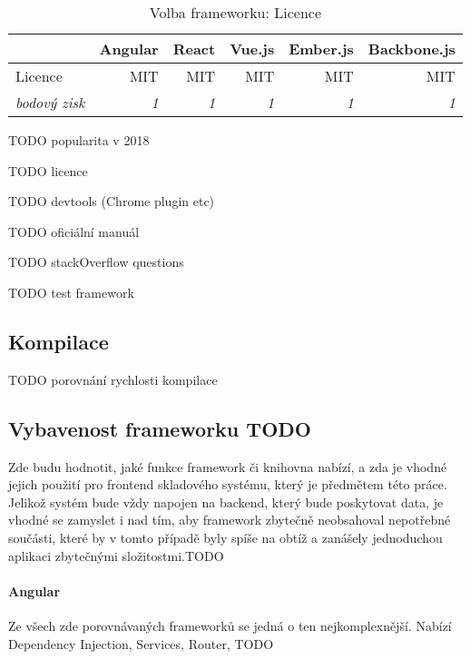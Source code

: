 \begin{table}[h]
\caption{Volba frameworku: Licence}
\label{table:compare:license}
\begin{tabular}{lrrrrr}
\hline
                                         & \multicolumn{1}{c}{Angular} & \multicolumn{1}{c}{React} & \multicolumn{1}{c}{Vue.js} & \multicolumn{1}{c}{Ember.js} & \multicolumn{1}{c}{Backbone.js} \\ \hline
Licence                                  & MIT                         & MIT                       & MIT                        & MIT                          & MIT                             \\
\multicolumn{1}{r}{\textit{bodový zisk}} & \textit{1}                  & \textit{1}                & \textit{1}                 & \textit{1}                   & \textit{1}                  
\end{tabular}
\end{table}



TODO popularita v 2018

TODO licence

TODO devtools (Chrome plugin etc)

TODO oficiální manuál

TODO stackOverflow questions

TODO test framework

\subsection{Kompilace}
TODO porovnání rychlosti kompilace


\subsection{Vybavenost frameworku TODO}

Zde budu hodnotit, jaké funkce framework či knihovna nabízí, a zda je vhodné jejich použití pro frontend skladového systému, který je předmětem této práce. Jelikož systém bude vždy napojen na backend, který bude poskytovat data, je vhodné se zamyslet i nad tím, aby framework zbytečně neobsahoval nepotřebné součásti, které by v tomto případě byly spíše na obtíž a zanášely jednoduchou aplikaci zbytečnými složitostmi.TODO

\paragraph{Angular} Ze všech zde porovnávaných frameworků se jedná o ten nejkomplexnější. Nabízí Dependency Injection, Services, Router, TODO

